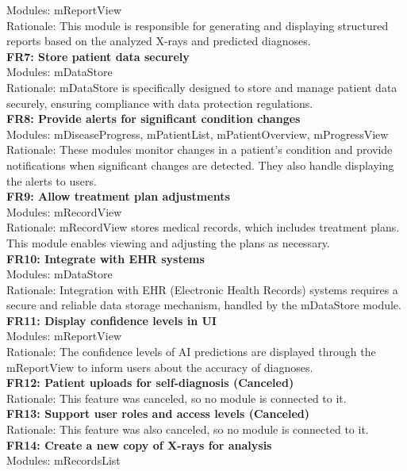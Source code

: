\documentclass[12pt, titlepage]{article}
\begin{document}
Modules: mReportView \\
Rationale: This module is responsible for generating and displaying structured reports based on the analyzed X-rays and predicted diagnoses. \\
\textbf{FR7: Store patient data securely} \\
Modules: mDataStore \\
Rationale: mDataStore is specifically designed to store and manage patient data securely, ensuring compliance with data protection regulations. \\
\textbf{FR8: Provide alerts for significant condition changes} \\
Modules: mDiseaseProgress, mPatientList, mPatientOverview, mProgressView \\
Rationale: These modules monitor changes in a patient's condition and provide notifications when significant changes are detected. They also handle displaying the alerts to users. \\
\textbf{FR9: Allow treatment plan adjustments} \\
Modules: mRecordView \\
Rationale: mRecordView stores medical records, which includes treatment plans. This module enables viewing and adjusting the plans as necessary. \\
\textbf{FR10: Integrate with EHR systems} \\
Modules: mDataStore \\
Rationale: Integration with EHR (Electronic Health Records) systems requires a secure and reliable data storage mechanism, handled by the mDataStore module. \\
\textbf{FR11: Display confidence levels in UI} \\
Modules: mReportView \\
Rationale: The confidence levels of AI predictions are displayed through the mReportView to inform users about the accuracy of diagnoses. \\
\textbf{FR12: Patient uploads for self-diagnosis (Canceled)} \\
Rationale: This feature was canceled, so no module is connected to it. \\
\textbf{FR13: Support user roles and access levels (Canceled)} \\
Rationale: This feature was also canceled, so no module is connected to it. \\
\textbf{FR14: Create a new copy of X-rays for analysis} \\
Modules: mRecordsList \\
\end{document}
